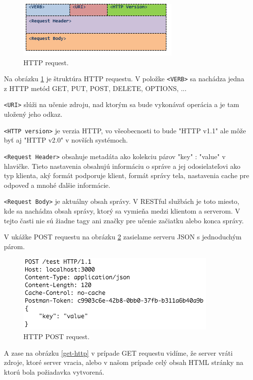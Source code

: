 \begin{figure}[H]
  \centering
  \includegraphics[scale=0.7]{img/rest/rest-http.png}
  \caption{HTTP request.}
  \label{rest-http}
\end{figure}

Na obrázku \ref{rest-http} je štruktúra HTTP requestu. V položke \verb|<VERB>| sa nachádza jedna z HTTP metód GET, PUT, POST, DELETE, OPTIONS, ...

\verb|<URI>| slúži na učenie zdroju, nad ktorým sa bude vykonávať operácia a je tam uložený jeho odkaz.

\verb|<HTTP version>| je verzia HTTP, vo všeobecnosti to bude "HTTP v1.1" ale môže byť aj "HTTP v2.0" v novších systémoch.

\verb|<Request Header>| obsahuje metadáta ako kolekciu párov "key" : "value" v hlavičke. Tieto nastavenia obsahujú informáciu o správe a jej odosielateľovi ako typ klienta, aký formát podporuje klient, formát správy tela, nastavenia cache pre odpoveď a mnohé ďalšie informácie.

\verb|<Request Body>| je aktuálny obsah správy. V RESTful službách je toto miesto, kde sa nachádza obsah správy, ktorý sa vymieňa medzi klientom a serverom. V tejto časti nie sú žiadne tagy ani značky pre učenie začiatku alebo konca správy.\cite{rest-vaqqas}

V ukážke POST requestu na obrázku \ref{post-http} zasielame serveru JSON s jednoduchým párom.

\begin{figure}[H]
  \centering
  \includegraphics[scale=0.7]{img/rest/post-request.png}
  \caption{HTTP POST request.}
  \label{post-http}
\end{figure}

A zase na obrázku \ref{get-http} v prípade GET requestu vidíme, že server vráti zdroje, ktoré server vracia, alebo v našom prípade celý obsah HTML stránky na ktorú bola požiadavka vytvorená.

